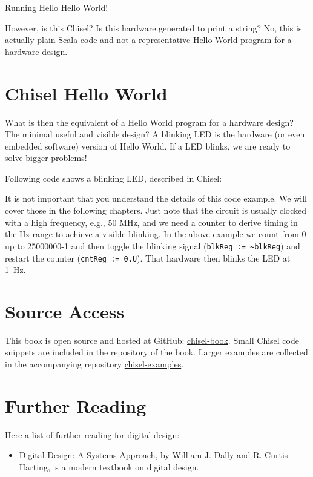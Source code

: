 \documentclass[%
    10pt, %
    headinclude, footexclude,
    openright, %
    notitlepage,
    cleardoubleempty,
    headsepline,
    pointlessnumbers,
    bibtotoc, idxtotoc,
    ]{scrbook}
\newcommand{\code}[1]{{\small{\texttt{#1}}}}
\newcommand{\myref}[2]{\href{#1}{#2}}
\begin{document}
\begin{chisel}
[info] Running Hello 
Hello World!
\end{chisel}

However, is this Chisel? Is this hardware generated to print a string?
No, this is actually plain Scala code and not a representative Hello World
program for a hardware design.

\section{Chisel Hello World}

What is then the equivalent of a Hello World program for a hardware design?
The minimal useful and visible design? A blinking LED is the hardware (or even
embedded software) version of Hello World. If a LED blinks, we are ready to
solve bigger problems!

Following code shows a blinking LED, described in Chisel:



It is not important that you understand the details of this code example.
We will cover those in the following chapters. Just note that the circuit is
usually clocked with a high frequency, e.g., 50 MHz, and we need a counter
to derive timing in the Hz range to achieve a visible blinking. In the above
example we count from 0 up to 25000000-1 and then toggle the blinking signal
(\code{blkReg := \textasciitilde blkReg}) and restart the counter (\code{cntReg := 0.U}).
That hardware then blinks the LED at 1~Hz.

\section{Source Access}

This book is open source and hosted at GitHub: \myref{https://github.com/schoeberl/chisel-book}{chisel-book}.
Small Chisel code snippets are included in the repository of the book.
Larger examples are collected in the accompanying repository \myref{https://github.com/schoeberl/chisel-examples}{chisel-examples}.

\section{Further Reading}

Here a list of further reading for digital design:
\begin{itemize}
\item \myref{http://www.cambridge.org/es/academic/subjects/engineering/circuits-and-systems/digital-design-systems-approach}{Digital Design: A Systems Approach}, by William J. Dally and R. Curtis Harting,
is a modern textbook on digital design.
\end{itemize}
\end{document}
